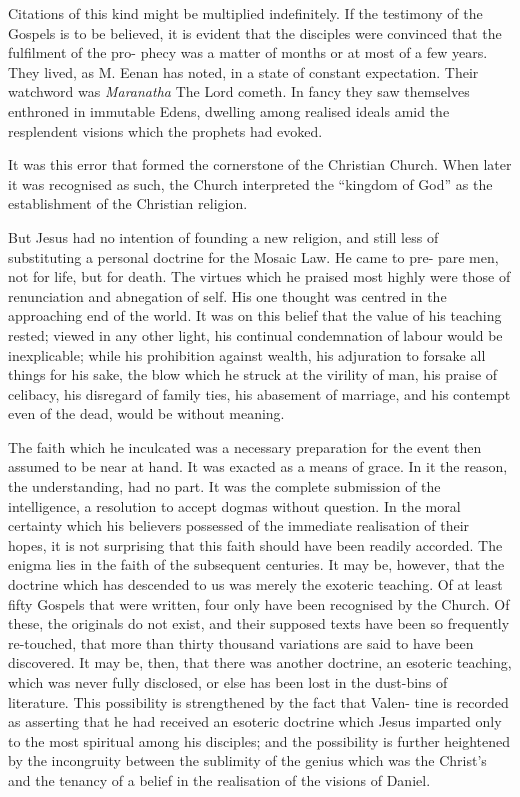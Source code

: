 \documentclass[]{book}
\begin{document}
Citations of this kind might be multiplied indefinitely. If the
testimony of the Gospels is to be believed, it is evident that the
disciples were convinced that the fulfilment of the pro- phecy was a
matter of months or at most of a few years. They lived, as M. Eenan has
noted, in a state of constant expectation. Their watchword was
\emph{Maranatha} The Lord cometh. In fancy they saw themselves enthroned
in immutable Edens, dwelling among realised ideals amid the resplendent
visions which the prophets had evoked.

It was this error that formed the cornerstone of the Christian Church.
When later it was recognised as such, the Church interpreted the
``kingdom of God'' as the establishment of the Christian religion.

But Jesus had no intention of founding a new religion, and still less of
substituting a personal doctrine for the Mosaic Law. He came to pre-
pare men, not for life, but for death. The virtues which he praised most
highly were those of renunciation and abnegation of self. His one
thought was centred in the approaching end of the world. It was on this
belief that the value of his teaching rested; viewed in any other light,
his continual condemnation of labour would be inexplicable; while his
prohibition against wealth, his adjuration to forsake all things for his
sake, the blow which he struck at the virility of man, his praise of
celibacy, his disregard of family ties, his abasement of marriage, and
his contempt even of the dead, would be without meaning.

The faith which he inculcated was a necessary preparation for the event
then assumed to be near at hand. It was exacted as a means of grace. In
it the reason, the understanding, had no part. It was the complete
submission of the intelligence, a resolution to accept dogmas without
question. In the moral certainty which his believers possessed of the
immediate realisation of their hopes, it is not surprising that this
faith should have been readily accorded. The enigma lies in the faith of
the subsequent centuries. It may be, however, that the doctrine which
has descended to us was merely the exoteric teaching. Of at least fifty
Gospels that were written, four only have been recognised by the Church.
Of these, the originals do not exist, and their supposed texts have been
so frequently re-touched, that more than thirty thousand variations are
said to have been discovered. It may be, then, that there was another
doctrine, an esoteric teaching, which was never fully disclosed, or else
has been lost in the dust-bins of literature. This possibility is
strengthened by the fact that Valen- tine is recorded as asserting that
he had received an esoteric doctrine which Jesus imparted only to the
most spiritual among his disciples; and the possibility is further
heightened by the incongruity between the sublimity of the genius which
was the Christ's and the tenancy of a belief in the realisation of the
visions of Daniel.
\end{document}
